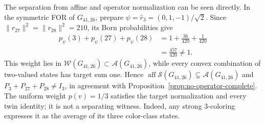 \documentclass[aps,pra,reprint,superscriptaddress,longbibliography,nofootinbib,floatfix,10pt]{revtex4-2}
\theoremstyle{definition}\newtheorem{definition}[theorem]{Definition}
\theoremstyle{remark}\newtheorem{remark}[theorem]{Remark}
\newcommand{\Sc}{\mathcal S}\newcommand{\Cc}{\mathcal C}\newcommand{\Wc}{\mathcal W}
\begin{document}
The separation from affine and operator normalization can be seen directly. In the symmetric FOR of $G_{41,26}$, prepare $\psi=\hat r_3=(0,1,-1)/\sqrt2$. Since $\|r_{27}\|^2=\|r_{28}\|^2=210$, its Born probabilities give
\begin{equation}\label{eq:roof-born-witness}
\begin{aligned}
p_\psi(3)+p_\psi(27)+p_\psi(28)
&=1+\frac{36}{420}+\frac1{420}\\
&=\frac{457}{420}\ne1.
\end{aligned}
\end{equation}
This weight lies in $\Wc(G_{41,26})\subset\mathcal A(G_{41,26})$, while every convex combination of two-valued states has target sum one. Hence $\operatorname{aff}\Sc(G_{41,26})\subsetneq\mathcal A(G_{41,26})$ and $P_3+P_{27}+P_{28}\ne I_3$, in agreement with Proposition~\ref{prop:no-operator-complete}. The uniform weight $p(v)=1/3$ satisfies the target normalization and every twin identity; it is not a separating witness. Indeed, any strong $3$-coloring expresses it as the average of its three color-class states.
\end{document}

